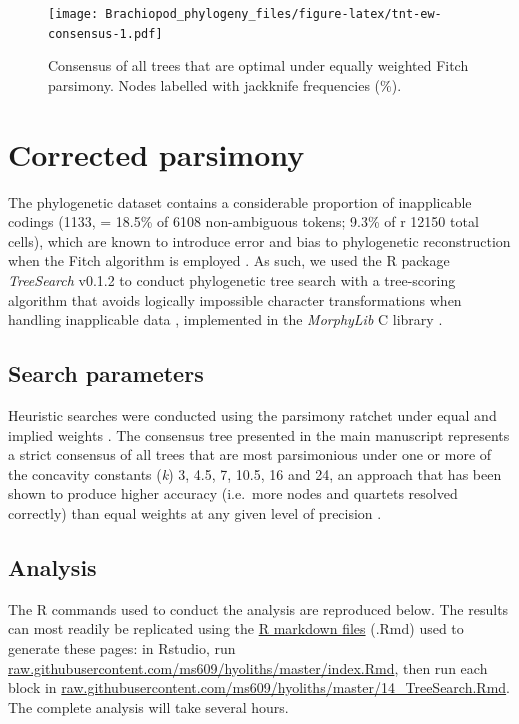 \documentclass[openany]{book}
\begin{document}
\newpage




\begin{figure}
\centering
\texttt{[image: Brachiopod\_phylogeny\_files/figure-latex/tnt-ew-consensus-1.pdf]}
\caption{\label{fig:tnt-ew-consensus}Consensus of all trees that are optimal under equally
weighted Fitch parsimony. Nodes labelled with jackknife frequencies (\%).}
\end{figure}

\hypertarget{treesearch}{\chapter{Corrected
parsimony}\label{treesearch}}

The phylogenetic dataset contains a considerable proportion of
inapplicable codings (1133, = 18.5\% of 6108 non-ambiguous tokens; 9.3\%
of r 12150 total cells), which are known to introduce error and bias to
phylogenetic reconstruction when the Fitch algorithm is employed
\citep{Maddison1993, Brazeau2018}. As such, we used the R package
\emph{TreeSearch} v0.1.2 \citep{Smith2018TreeSearch} to conduct
phylogenetic tree search with a tree-scoring algorithm that avoids
logically impossible character transformations when handling
inapplicable data \citep{Brazeau2018}, implemented in the
\emph{MorphyLib} C library \citep{Brazeau2017Morphylib}.

\section{Search parameters}\label{search-parameters}

Heuristic searches were conducted using the parsimony ratchet
\citep{Nixon1999} under equal and implied weights \citep{Goloboff1997}.
The consensus tree presented in the main manuscript represents a strict
consensus of all trees that are most parsimonious under one or more of
the concavity constants (\emph{k}) 3, 4.5, 7, 10.5, 16 and 24, an
approach that has been shown to produce higher accuracy (i.e.~more nodes
and quartets resolved correctly) than equal weights at any given level
of precision \citep{Smith2017}.

\section{Analysis}\label{analysis}

The R commands used to conduct the analysis are reproduced below. The
results can most readily be replicated using the
\href{https://github.com/ms609/hyoliths/}{R markdown files} (.Rmd) used
to generate these pages: in Rstudio, run
\href{https://raw.githubusercontent.com/ms609/hyoliths/master/index.Rmd}{raw.githubusercontent.com/ms609/hyoliths/master/index.Rmd},
then run each block in
\href{https://raw.githubusercontent.com/ms609/hyoliths/master/14_TreeSearch.Rmd}{raw.githubusercontent.com/ms609/hyoliths/master/14\_TreeSearch.Rmd}.
The complete analysis will take several hours.
\end{document}
